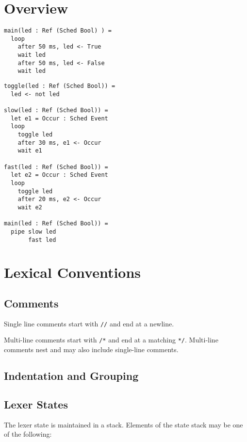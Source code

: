 \documentclass{article}
\begin{document}
\section{Overview}

\begin{lstlisting}
main(led : Ref (Sched Bool) ) =
  loop
    after 50 ms, led <- True
    wait led
    after 50 ms, led <- False
    wait led
\end{lstlisting}

\begin{lstlisting}
toggle(led : Ref (Sched Bool)) =
  led <- not led

slow(led : Ref (Sched Bool)) =
  let e1 = Occur : Sched Event
  loop
    toggle led
    after 30 ms, e1 <- Occur
    wait e1

fast(led : Ref (Sched Bool)) =
  let e2 = Occur : Sched Event
  loop
    toggle led
    after 20 ms, e2 <- Occur
    wait e2
    
main(led : Ref (Sched Bool)) =
  pipe slow led
       fast led
\end{lstlisting}

\section{Lexical Conventions}

\subsection{Comments}

Single line comments start with \lstinline!//! and end at a newline.

Multi-line comments start with \lstinline!/*! and end at a matching
\lstinline!*/!.  Multi-line comments nest and may also include
single-line comments.

\subsection{Indentation and Grouping}

\subsection{Lexer States}

The lexer state is maintained in a stack. Elements of the state stack may be one
of the following:
\end{document}
